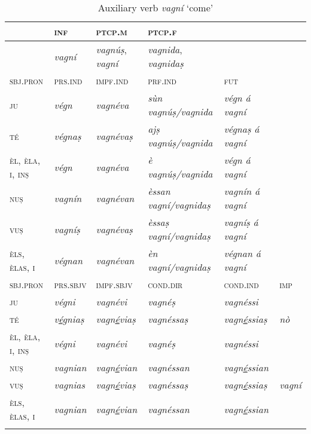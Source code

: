 \begin{table}
\caption{Auxiliary verb \textit{vagní} `come'}
\label{tab:aux:vagní}
 \begin{tabular}{llllll} 
  \lsptoprule
& \textsc{inf}  & \textsc{ptcp.m}  & \textsc{ptcp.f}\\
  \midrule
&\textit{vagní} &\textit{vagnúṣ}, \textit{vagní} & \textit{vagnida}, \textit{vagnidaṣ}\\
   
  \lsptoprule
\textsc{sbj.pron} & \textsc{prs.ind}  &\textsc{impf.ind} & \textsc{prf.ind} & \textsc{fut}\\
   \midrule
\textsc{ju} & \textit{végn} & \textit{vagnéva} &\textit{sùn vagnúṣ/vagnida} &\textit{végn á vagní}\\
\textsc{té} &\textit{végnaṣ} &\textit{vagnévaṣ} & \textit{ajṣ vagnúṣ/vagnida} & \textit{végnaṣ á vagní}\\
\textsc{èl, èla, i, inṣ} &\textit{végn} & \textit{vagnéva} &\textit{è vagnúṣ/vagnida} &\textit{végn á vagní}\\
\textsc{nuṣ} &\textit{vagnín} &\textit{vagnévan} &\textit{èssan vagní/vagnidaṣ} &\textit{vagnín á vagní}\\
\textsc{vuṣ} &\textit{vagníṣ} & \textit{vagnévaṣ} &\textit{èssaṣ vagní/vagnidaṣ} &\textit{vagníṣ á vagní}\\
\textsc{èls, èlas, i}& \textit{végnan} & \textit{vagnévan} &\textit{èn vagní/vagnidaṣ} &\textit{végnan á vagní}\\

 \lsptoprule
\textsc{sbj.pron} &\textsc{prs.sbjv} & \textsc{impf.sbjv}  &\textsc{cond.dir} & \textsc{cond.ind} & \textsc{imp}\\
\midrule
\textsc{ju} & \textit{végni}& \textit{vagnévi} & \textit{vagnéṣ}& \textit{vagnéssi}\\
\textsc{té} & \textit{v\underline{é}gniaṣ} & \textit{vagn\underline{é}viaṣ} & \textit{vagnéssaṣ} & \textit{vagn\underline{é}ssiaṣ} & \textit{nò}\\
\textsc{èl, èla, i, inṣ} & \textit{végni} & \textit{vagnévi} & \textit{vagnéṣ} & \textit{vagnéssi}\\
\textsc{nuṣ} & \textit{vagnian} & \textit{vagn\underline{é}vian} & \textit{vagnéssan} & \textit{vagn\underline{é}ssian}\\
\textsc{vuṣ} & \textit{vagnias}& \textit{vagn\underline{é}viaṣ} & \textit{vagnéssaṣ} & \textit{vagn\underline{é}ssiaṣ} & \textit{vagní}\\
\textsc{èls, èlas, i} & \textit{vagnian} & \textit{vagn\underline{é}vian}& \textit{vagnéssan} & \textit{vagn\underline{é}ssian}\\
  \lspbottomrule
 \end{tabular}
\end{table}


